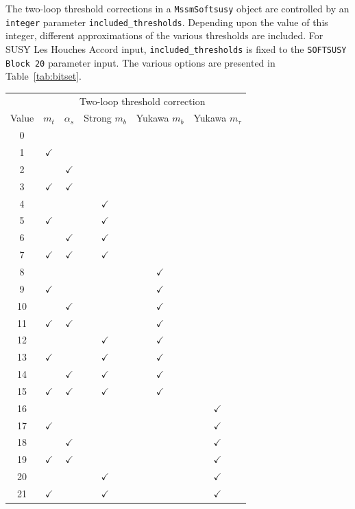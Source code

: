 \documentclass[final,3p,times,pdflatex]{elsarticle}
\begin{document}
The two-loop threshold corrections in a {\tt MssmSoftsusy} object are
controlled by an {\tt integer} parameter \verb|included_thresholds|. 
Depending upon the value of this integer, different approximations of the
various thresholds are included. For SUSY Les Houches Accord input,
\verb|included_thresholds| is fixed to the {\tt SOFTSUSY Block 20} parameter
input.
The various options are presented in Table~\ref{tab:bitset}.
\begin{table}
\begin{center}
\begin{tabular}{|c|ccccc|} \hline
 & \multicolumn{5}{c|}{Two-loop threshold correction} \\ 
Value & $m_t$ & $\alpha_s$ & Strong $m_b$ & Yukawa $m_b$ & Yukawa $m_\tau$ \\ 
\hline
0 & & & & & \\
1 & $\checkmark$ & & & & \\
2 & & $\checkmark$ & & & \\
3 & $\checkmark$ & $\checkmark$ & & & \\
4 & & & $\checkmark$ & & \\
5 & $\checkmark$ & & $\checkmark$ & & \\
6 & & $\checkmark$ & $\checkmark$ & & \\
7 & $\checkmark$ & $\checkmark$ & $\checkmark$ & & \\
8  & & & & $\checkmark$& \\
9  &$\checkmark$ & & &$\checkmark$ & \\
10 & &$\checkmark$ & &$\checkmark$ & \\
11 & $\checkmark$ &$\checkmark$ & &$\checkmark$ & \\
12 & & &$\checkmark$ &$\checkmark$ & \\
13 &$\checkmark$ & &$\checkmark$ &$\checkmark$ & \\
14 & &$\checkmark$ & $\checkmark$ &$\checkmark$ & \\
15 &$\checkmark$ &$\checkmark$ & $\checkmark$ &$\checkmark$ & \\
16 & & & & & $\checkmark$\\
17 &$\checkmark$ & & & &$\checkmark$ \\
18 & &$\checkmark$ & & &$\checkmark$ \\
19 &$\checkmark$ &$\checkmark$ & & &$\checkmark$ \\
20 & & &$\checkmark$ & & $\checkmark$\\
21 &$\checkmark$ & &$\checkmark$ & &$\checkmark$ \\

\end{tabular}
\end{center}
\end{table}
\end{document}
